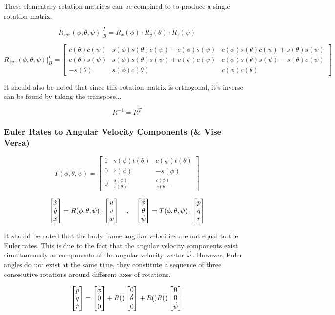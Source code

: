 These elementary rotation matrices can be combined to to produce a single rotation matrix. 

$$ R_{zyx}(\phi, \theta, \psi)\biggr\rvert_{B}^{I} = R_{x}(\phi) \cdot R_{y}(\theta) \cdot R_{z}(\psi)$$

$$ R_{zyx}(\phi, \theta, \psi)\biggr\rvert_{B}^{I} = \begin{bmatrix}
    c(\theta)c(\psi) & s(\phi)s(\theta)c(\psi)-c(\phi)s(\psi) & c(\phi)s(\theta)c(\psi)+s(\theta)s(\psi)\\
    c(\theta)s(\psi) & s(\phi)s(\theta)s(\psi)+c(\phi)c(\psi) & c(\phi)s(\theta)s(\psi)-s(\theta)c(\psi)\\
    -s(\theta) & s(\phi)c(\theta) & c(\phi)c(\theta)
\end{bmatrix}$$

It should also be noted that since this rotation matrix is orthogonal, it's inverse can be found by taking the transpose... 

$$ R^{-1} = R^{T}$$

\subsubsection{Euler Rates to Angular Velocity Components (\& Vise Versa)}

$$ T(\phi, \theta, \psi) = \begin{bmatrix}
    1 & s(\phi)t(\theta) & c(\phi)t(\theta)\\
    0 & c(\phi) & -s(\phi)\\
    0 & \frac{s(\phi)}{c(\theta)} & \frac{c(\phi)}{c(\theta)}
\end{bmatrix}$$



$$\begin{bmatrix} \dot{x} \\ \dot{y} \\ \dot{x} \end{bmatrix} = R(\phi, \theta, \psi) \cdot \begin{bmatrix} u \\ v \\ w \end{bmatrix} \quad , \quad  \begin{bmatrix} \dot{\phi} \\ \dot{\theta} \\ \dot{\psi} \end{bmatrix} = T(\phi, \theta, \psi) \cdot \begin{bmatrix} p \\ q \\ r \end{bmatrix} $$

It should be noted that the body frame angular velocities are not equal to the Euler rates. This is due to the fact that the angular velocity components exist simultaneously as components of the angular velocity vector $\overset{\rightharpoonup}{\omega}$. However, Euler angles do not exist at the same time, they constitute a sequence of three consecutive rotations around different axes of rotations. 



$$\begin{bmatrix} \dot{p} \\ \dot{q} \\ \dot{r} \end{bmatrix} = \begin{bmatrix} \dot{\phi} \\ 0 \\ 0 \end{bmatrix} + R() \begin{bmatrix} 0 \\ \dot{\theta} \\ 0 \end{bmatrix} + R()R() \begin{bmatrix} 0 \\ 0 \\ \dot{\psi} \end{bmatrix}$$

